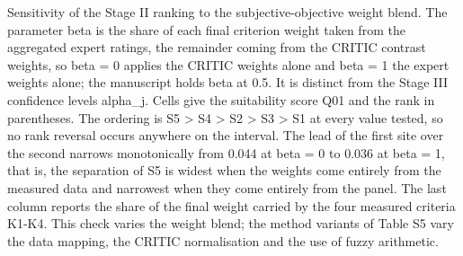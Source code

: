 \documentclass[11pt,a4paper]{article}
\begin{document}
Sensitivity of the Stage II ranking to the subjective-objective weight blend. The parameter beta is the share of each final criterion weight taken from the aggregated expert ratings, the remainder coming from the CRITIC contrast weights, so beta = 0 applies the CRITIC weights alone and beta = 1 the expert weights alone; the manuscript holds beta at 0.5. It is distinct from the Stage III confidence levels alpha\_j. Cells give the suitability score Q01 and the rank in parentheses. The ordering is S5 > S4 > S2 > S3 > S1 at every value tested, so no rank reversal occurs anywhere on the interval. The lead of the first site over the second narrows monotonically from 0.044 at beta = 0 to 0.036 at beta = 1, that is, the separation of S5 is widest when the weights come entirely from the measured data and narrowest when they come entirely from the panel. The last column reports the share of the final weight carried by the four measured criteria K1-K4. This check varies the weight blend; the method variants of Table S5 vary the data mapping, the CRITIC normalisation and the use of fuzzy arithmetic.
\end{document}
